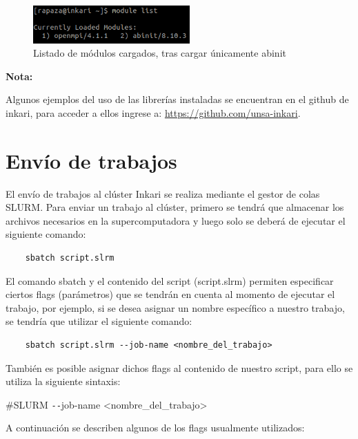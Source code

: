 \documentclass[a4paper,11pt]{article}
\newenvironment{note}
{
    \vspace{0.22cm}
    \noindent
    \textbf{Nota: }
}
{
    \vspace{0.22cm}
}
\begin{document}
\begin{figure}[!ht]
    \centering
    \includegraphics[width=6cm]{module_list}
    \caption{Listado de módulos cargados, tras cargar únicamente abinit}
    \label{fig:module_list}
\end{figure}

\begin{note}
    Algunos ejemplos del uso de las librerías instaladas se encuentran en el github de inkari, para acceder a ellos ingrese a: \url{https://github.com/unsa-inkari}.
\end{note}

\section{Envío de trabajos}

El envío de trabajos al clúster Inkari se realiza mediante el gestor de colas SLURM.
Para enviar un trabajo al clúster, primero se tendrá que almacenar los archivos necesarios en la supercomputadora y luego solo se deberá de ejecutar el siguiente comando:

\begin{lstlisting}
    sbatch script.slrm
\end{lstlisting}

El comando sbatch y el contenido del script (script.slrm) permiten especificar ciertos flags (parámetros) que se tendrán en cuenta al momento de ejecutar el trabajo, por ejemplo, si se desea asignar un nombre específico a nuestro trabajo, se tendría que utilizar el siguiente comando:

\begin{lstlisting}
    sbatch script.slrm --job-name <nombre_del_trabajo>
\end{lstlisting}

También es posible asignar dichos flags al contenido de nuestro script, para ello se utiliza la siguiente sintaxis:

\begin{center}
    \#SLURM \texttt{-{}-}job-name <nombre\_del\_trabajo>
\end{center}

\newpage

A continuación se describen algunos de los flags usualmente utilizados:
\end{document}
